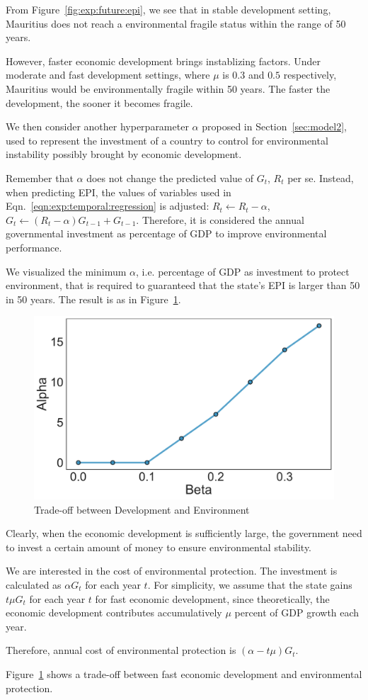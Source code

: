 From Figure~\ref{fig:exp:future:epi}, we see that in stable development setting, Mauritius does not reach a environmental fragile status within the range of 50 years.

However, faster economic development brings instablizing factors. Under moderate and fast development settings, where $\mu$ is $0.3$ and $0.5$ respectively, Mauritius would be environmentally fragile within 50 years. The faster the development, the sooner it becomes fragile.

We then consider another hyperparameter $\alpha$ proposed in Section~\ref{sec:model2}, used to represent the investment of a country to control for environmental instability possibly brought by economic development.

Remember that $\alpha$ does not change the predicted value of $G_t$, $R_t$ per se. Instead, when predicting EPI, the values of variables used in Eqn.~\ref{eqn:exp:temporal:regression} is adjusted: $R_t\leftarrow R_t-\alpha$, $G_t\leftarrow (R_t-\alpha)G_{t-1}+G_{t-1}$. Therefore, it is considered the annual governmental investment as percentage of GDP to improve environmental performance.

We visualized the minimum $\alpha$, i.e. percentage of GDP as investment to protect environment, that is required to guaranteed that the state's EPI is larger than 50 in 50 years. The result is as in Figure~\ref{fig:exp:tradeoff}.
\begin{figure}[htbp]
   \centering
   \includegraphics[width=.4\linewidth]{figs/tradeoff} 
   \caption{Trade-off between Development and Environment}
   \label{fig:exp:tradeoff}
\end{figure}

Clearly, when the economic development is sufficiently large, the government need to invest a certain amount of money to ensure environmental stability.

We are interested in the cost of environmental protection. The investment is calculated as $\alpha G_t$ for each year $t$. For simplicity, we assume that the state gains $t\mu G_t$ for each year $t$ for fast economic development, since theoretically, the economic development contributes accumulatively $\mu$ percent of GDP growth each year.

Therefore, annual cost of environmental protection is $(\alpha-t\mu)G_t$.

Figure~\ref{fig:exp:tradeoff} shows a trade-off between fast economic development and environmental protection. 
